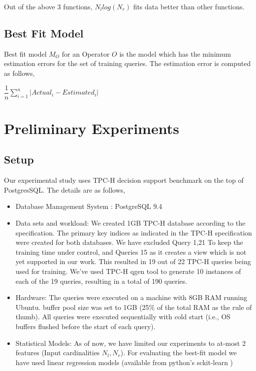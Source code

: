 \documentclass{article}
\begin{document}
\begin{multicols}{2}
	Out of the above 3 functions, $N_{l} log(N_{r})$ fits data better than other functions. 	
	\subsection{Best Fit Model}	
	Best fit model $M_{O}$ for an Operator $O$ is the model which has the minimum estimation errors 
	for the set of training queries. The estimation error is computed as follows,
	
	\begin{center}
	$\dfrac{1}{n} \sum\limits_{i=1}^n \left| Actual_{i} - Estimated_{i} \right|$
	\end{center}
	
	\section{Preliminary Experiments}
	\subsection{Setup}
	Our experimental study uses TPC-H decision support benchmark \cite{TPCH} on the top of 
	PostgresSQL. The details are as follows, 

	\begin{itemize}
	\item Database Management System : PostgreSQL 9.4
	\item Data sets and workload: We created 1GB TPC-H database
	according to the specification. The primary key indices as indicated
	in the TPC-H specification were created for both databases. We have excluded Query 1,21  
	To keep the training time under control, and Queries 15 as it creates a view which is not yet
	supported in our work. This resulted in 19 out of 22 TPC-H queries being used for training. We've 
	used TPC-H qgen tool to generate 10 instances of each of the 19 queries, resulting in a total of 190 
	queries.
	
	\item Hardware: The queries were executed on a machine
	with 8GB RAM running Ubuntu. buffer pool size was set to 1GB (25\% of the total RAM as the rule
	of thumb). All queries were executed sequentially with cold start
	(i.e., OS buffers flushed before the start of each query).
	
	\item Statistical Models: As of now, we have limited our experiments to at-most 2 features (Input 			cardinalities $N_{l} , N_{r}$). For evaluating the best-fit model we have used linear regression 			models (available from python's sckit-learn \cite{sckit})
	

\end{itemize}
\end{multicols}
\end{document}
